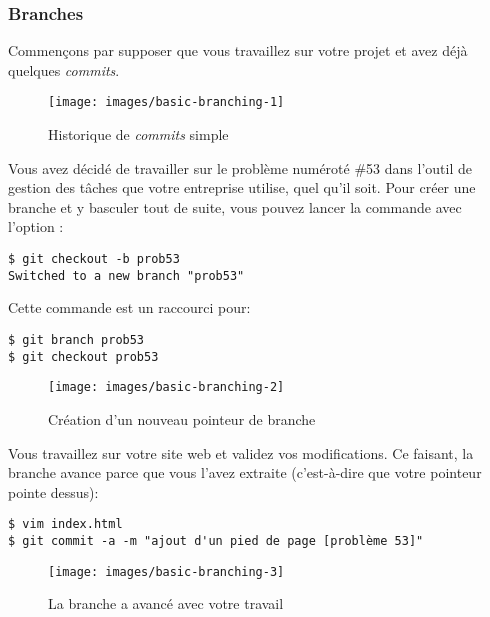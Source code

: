 \subsubsection{Branches}
\label{sec:git:basic_branching}

Commençons par supposer que vous travaillez sur votre projet et avez déjà quelques \emph{commits}.

\begin{figure}[H]
  \centering
  \texttt{[image: images/basic-branching-1]}
  \caption{Historique de \emph{commits} simple}
  \label{fig:git:basic-branching-1}
\end{figure}

Vous avez décidé de travailler sur le problème numéroté \#53 dans l'outil de gestion des tâches que votre entreprise utilise, quel qu'il soit.
Pour créer une branche et y basculer tout de suite, vous pouvez lancer la commande  avec l'option :
\begin{Schunk}
\begin{Verbatim}
$ git checkout -b prob53
Switched to a new branch "prob53"
\end{Verbatim}
\end{Schunk}

Cette commande est un raccourci pour:
\begin{Schunk}
\begin{Verbatim}
$ git branch prob53
$ git checkout prob53
\end{Verbatim}
\end{Schunk}

\begin{figure}[H]
  \centering
  \texttt{[image: images/basic-branching-2]}
  \caption{Création d'un nouveau pointeur de branche}
  \label{fig:git:basic-branching-2}
\end{figure}

Vous travaillez sur votre site web et validez vos modifications.
Ce faisant, la branche  avance parce que vous l'avez extraite (c'est-à-dire que votre pointeur  pointe dessus):
\begin{Schunk}
\begin{Verbatim}
$ vim index.html
$ git commit -a -m "ajout d'un pied de page [problème 53]"
\end{Verbatim}
\end{Schunk}

\begin{figure}[H]
  \centering
  \texttt{[image: images/basic-branching-3]}
  \caption{La branche  a avancé avec votre travail}
  \label{fig:git:basic-branching-3}
\end{figure}

